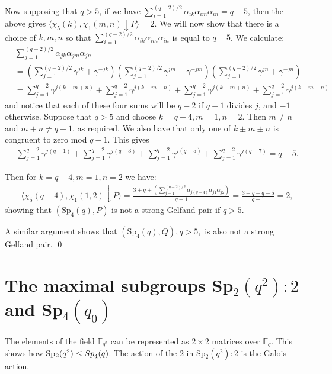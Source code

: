 \documentclass[10pt,a4paper]{amsart}
\theoremstyle{plain}
\theoremstyle{definition}
\numberwithin{equation}{section}
\begin{document}
Now supposing that $q>5$, if we have $\sum_{i=1}^{(q-2)/2}\alpha_{ik}\alpha_{im}\alpha_{in}=q-5$, then the above gives $\langle \chi_5(k), \chi_1(m, n)\downarrow P\rangle=2$. We will now show that there is a choice of $k, m, n$ so that $\sum_{i=1}^{(q-2)/2}\alpha_{ik}\alpha_{im}\alpha_{in}$ is equal to  $q-5$.
We calculate:
\begin{align*}
&\sum_{j=1}^{(q-2)/2}\alpha_{jk}\alpha_{jm}\alpha_{jn}\\
&= \left(\sum_{j=1}^{(q-2)/2} \gamma^{jk}+\gamma^{-jk}\right)\left(\sum_{j=1}^{(q-2)/2} \gamma^{jm}+\gamma^{-jm}\right)\left(\sum_{j=1}^{(q-2)/2} \gamma^{jn}+\gamma^{-jn}\right)\\
&=\sum_{j=1}^{q-2} \gamma^{j(k+m+n)} + \sum_{j=1}^{q-2} \gamma^{j(k+m-n)} + \sum_{j=1}^{q-2} \gamma^{j(k-m+n)} + \sum_{j=1}^{q-2} \gamma^{j(k-m-n)}
\end{align*}
and notice that each of these four sums will be $q-2$ if $q-1$ divides  $j$, and $-1$ otherwise. Suppose that $q>5$ and choose $k=q-4, m=1, n=2$. Then  $m\neq n$ and $m+n\neq q-1$, as required. We also have that only one of $k\pm m \pm n $ is congruent to zero mod
  ${q-1}$. This gives
\begin{align*}
&\sum_{j=1}^{q-2} \gamma^{j(q-1)} + \sum_{j=1}^{q-2} \gamma^{j(q-3)} + \sum_{j=1}^{q-2} \gamma^{j(q-5)} + \sum_{j=1}^{q-2} \gamma^{j(q-7)} = q-5.
\end{align*}

Then for $k=q-4, m=1, n=2$ we have:
\begin{align*}
&\langle \chi_5(q-4), \chi_1(1, 2)\downarrow P\rangle = \frac{3+q+\left(\sum_{j=1}^{(q-2)/2} \alpha_{j(q-4)}\alpha_{j1}\alpha_{j2}\right)}{q-1}
 = \frac{3+q+q-5}{q-1}
= 2,
\end{align*}
showing that $(\mathrm{Sp}_4(q), P)$ is not a strong Gelfand pair if $q>5$.

A similar argument shows that $(\mathrm{Sp}_4(q), Q), q>5,$ is also not a strong Gelfand pair.
\qed
\medskip



\section {The maximal subgroups Sp$_2(q^2):2$ and {\rm Sp}$_4(q_0)$}

The elements of  the field $\mathbb F_{q^2}$ can be represented as $2 \times 2$ matrices over $\mathbb F_q$. This shows how Sp$_2(q^2)\le
{\rm Sp}_4(q)$. The action of the $2$ in Sp$_2(q^2):2$ is the Galois action. 
\end{document}
